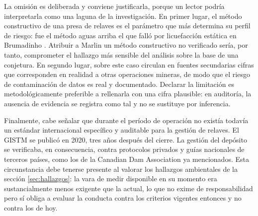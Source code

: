 La omisión es deliberada y conviene justificarla, porque un lector podría
interpretarla como una laguna de la investigación. En primer lugar, el método
constructivo de una presa de relaves es el parámetro que más determina su perfil
de riesgo: fue el método aguas arriba el que falló por licuefacción estática en
Brumadinho \parencite{robertson2019feijao}. Atribuir a Marlin un método
constructivo no verificado sería, por tanto, comprometer el hallazgo más sensible
del análisis sobre la base de una conjetura. En segundo lugar, sobre este caso
circulan en fuentes secundarias cifras que corresponden en realidad a otras
operaciones mineras, de modo que el riesgo de contaminación de datos es real y
documentado. Declarar la limitación es metodológicamente preferible a rellenarla
con una cifra plausible: en auditoría, la ausencia de evidencia se registra como
tal y no se sustituye por inferencia.

Finalmente, cabe señalar que durante el período de operación no existía todavía un
estándar internacional específico y auditable para la gestión de relaves. El
GISTM se publicó en 2020, tres años después del cierre. La gestión del depósito se
verificaba, en consecuencia, contra protocolos privados y guías nacionales de
terceros países, como los de la Canadian Dam Association ya mencionados. Esta
circunstancia debe tenerse presente al valorar los hallazgos ambientales de la
sección \ref{sec:hallazgos}: la vara de medir disponible en su momento era
sustancialmente menos exigente que la actual, lo que no exime de responsabilidad
pero sí obliga a evaluar la conducta contra los criterios vigentes entonces y no
contra los de hoy.
